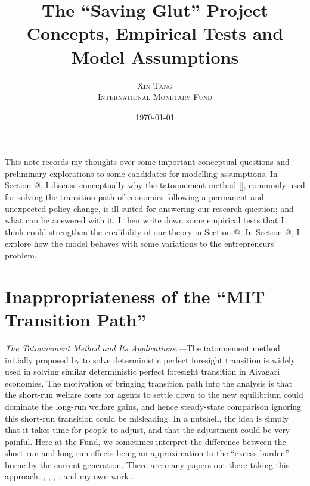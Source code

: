 \documentclass[twoside,11pt,leqno]{article}
\title{\vspace{-1cm}\Large{{\textsf{The ``Saving Glut'' Project}} \\ \textsf{Concepts, Empirical Tests and Model Assumptions}}}
\author{\normalsize\textsc{Xin Tang} \\ \normalsize\textsc{International Monetary Fund}}
\date{\normalsize\today}
\makeatletter
\newcommand*{\rom}[1]{\expandafter\@slowromancap\romannumeral #1@}
\makeatother
\begin{document}
\maketitle

This note records my thoughts over some important conceptual questions and preliminary explorations to some candidates for modelling assumptions. In Section \rom{1}, I discuss conceptually why the tatonnement method [\citet{AuerbachKotlikoff:1987book}], commonly used for solving the transition path of \citet{Aiyagari:1994} economies following a permanent and unexpected policy change, is ill-suited for answering our research question; and what can be answered with it. I then write down some empirical tests that I think could strengthen the credibility of our theory in Section \rom{2}. In Section \rom{3}, I explore how the model behaves with some variations to the entrepreneurs' problem.

\section{Inappropriateness of the ``MIT Transition Path''}

\textit{The Tatonnement Method and Its Applications.---}The tatonnement method initially proposed by \citet{AuerbachKotlikoff:1987book} to solve deterministic perfect foresight transition is widely used in solving similar deterministic perfect foresight transition in Aiyagari economies. The motivation of bringing transition path into the analysis is that the short-run welfare costs for agents to settle down to the new equilibrium could dominate the long-run welfare gains, and hence steady-state comparison ignoring this short-run transition could be misleading. In a nutshell, the idea is simply that it takes time for people to adjust, and that the adjustment could be very painful. Here at the Fund, we sometimes interpret the difference between the short-run and long-run effects being an approximation to the ``excess burden'' borne by the current generation. There are many papers out there taking this approach: \citet{DomeijHeathcote:2004}, \citet{Anagnostopoulosetal:2012}, \citet{Bakisetal:2015}, \citet{RohrsWinter:2017}, and my own work \citet{FiscalConsolidation:2019}.
\end{document}
